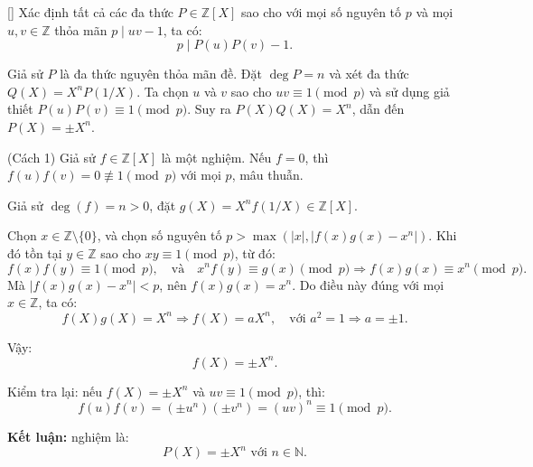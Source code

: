 \documentclass[../07-integer-polynomials.tex]{subfiles}
\begin{document}
\begin{example*}\label{example:FRA-2015-TST2-P2}[\textbf{}]
    Xác định tất cả các đa thức \( P \in \mathbb{Z}[X] \) sao cho với mọi số nguyên tố \( p \) và mọi \( u, v \in \mathbb{Z} \) thỏa mãn \( p \mid uv - 1 \), ta có:
    \[
        p \mid P(u)P(v) - 1.
    \]
\end{example*}

\begin{story*}
    Giả sử \( P \) là đa thức nguyên thỏa mãn đề. Đặt \( \deg P = n \) và xét đa thức \( Q(X) = X^n P(1/X) \).  
    Ta chọn \( u \) và \( v \) sao cho \( uv \equiv 1 \pmod{p} \) và sử dụng giả thiết \( P(u)P(v) \equiv 1 \pmod{p} \).  
    Suy ra \( P(X)Q(X) = X^n \), dẫn đến \( P(X) = \pm X^n \).
\end{story*}

\begin{soln}(Cách 1)\footnotemark
    Giả sử \( f \in \mathbb{Z}[X] \) là một nghiệm. Nếu \( f = 0 \), thì \( f(u)f(v) = 0 \not\equiv 1 \pmod{p} \) với mọi \( p \), mâu thuẫn.

    Giả sử \( \deg(f) = n > 0 \), đặt \( g(X) = X^n f(1/X) \in \mathbb{Z}[X] \).

    Chọn \( x \in \mathbb{Z} \setminus \{0\} \), và chọn số nguyên tố \( p > \max(|x|, |f(x)g(x) - x^n|) \). Khi đó tồn tại \( y \in \mathbb{Z} \) sao cho \( xy \equiv 1 \pmod{p} \), từ đó:
    \[
        f(x) f(y) \equiv 1 \pmod{p},\quad \text{và}\quad x^n f(y) \equiv g(x) \pmod{p} \Rightarrow f(x) g(x) \equiv x^n \pmod{p}.
    \]
    Mà \( |f(x)g(x) - x^n| < p \), nên \( f(x)g(x) = x^n \). Do điều này đúng với mọi \( x \in \mathbb{Z} \), ta có:
    \[
        f(X)g(X) = X^n \Rightarrow f(X) = aX^n,\quad \text{với } a^2 = 1 \Rightarrow a = \pm 1.
    \]

    Vậy:
    \[
        f(X) = \pm X^n.
    \]

    Kiểm tra lại: nếu \( f(X) = \pm X^n \) và \( uv \equiv 1 \pmod{p} \), thì:
    \[
        f(u)f(v) = (\pm u^n)(\pm v^n) = (uv)^n \equiv 1 \pmod{p}.
    \]

    \textbf{Kết luận:} nghiệm là:
    \[
        \boxed{P(X) = \pm X^n \text{ với } n \in \mathbb{N}.}
    \]
\end{soln}

\end{document}

